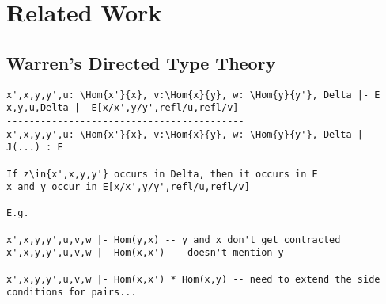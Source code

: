 \documentclass[11pt]{article}
\theoremstyle{plain}
\begin{document}








\section{Related Work}

\subsection{Warren's Directed Type Theory}

\begin{verbatim}
x',x,y,y',u: \Hom{x'}{x}, v:\Hom{x}{y}, w: \Hom{y}{y'}, Delta |- E
x,y,u,Delta |- E[x/x',y/y',refl/u,refl/v]
------------------------------------------
x',x,y,y',u: \Hom{x'}{x}, v:\Hom{x}{y}, w: \Hom{y}{y'}, Delta |- J(...) : E

If z\in{x',x,y,y'} occurs in Delta, then it occurs in E
x and y occur in E[x/x',y/y',refl/u,refl/v]

E.g. 

x',x,y,y',u,v,w |- Hom(y,x) -- y and x don't get contracted
x',x,y,y',u,v,w |- Hom(x,x') -- doesn't mention y

x',x,y,y',u,v,w |- Hom(x,x') * Hom(x,y) -- need to extend the side conditions for pairs...
\end{verbatim}


{ %


}
\end{document}
